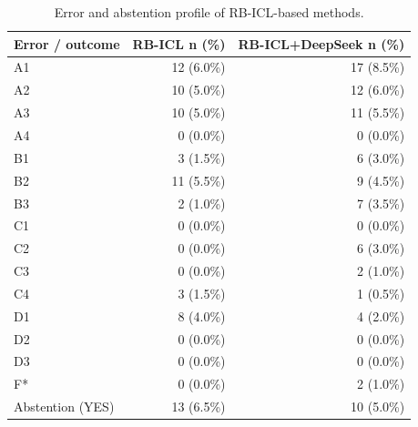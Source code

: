\begin{table}[htbp]
\centering
\small
\begin{tabular}{lrr}
\toprule
Error / outcome & RB-ICL n (\%) & RB-ICL+DeepSeek n (\%) \\
\midrule
A1 & 12 (6.0\%) & 17 (8.5\%) \\
A2 & 10 (5.0\%) & 12 (6.0\%) \\
A3 & 10 (5.0\%) & 11 (5.5\%) \\
A4 & 0 (0.0\%) & 0 (0.0\%) \\
B1 & 3 (1.5\%) & 6 (3.0\%) \\
B2 & 11 (5.5\%) & 9 (4.5\%) \\
B3 & 2 (1.0\%) & 7 (3.5\%) \\
C1 & 0 (0.0\%) & 0 (0.0\%) \\
C2 & 0 (0.0\%) & 6 (3.0\%) \\
C3 & 0 (0.0\%) & 2 (1.0\%) \\
C4 & 3 (1.5\%) & 1 (0.5\%) \\
D1 & 8 (4.0\%) & 4 (2.0\%) \\
D2 & 0 (0.0\%) & 0 (0.0\%) \\
D3 & 0 (0.0\%) & 0 (0.0\%) \\
F* & 0 (0.0\%) & 2 (1.0\%) \\
Abstention (YES) & 13 (6.5\%) & 10 (5.0\%) \\
\bottomrule
\end{tabular}
\caption{Error and abstention profile of RB-ICL-based methods. }
\label{tab:rb_icl_error_profile}
\end{table}
